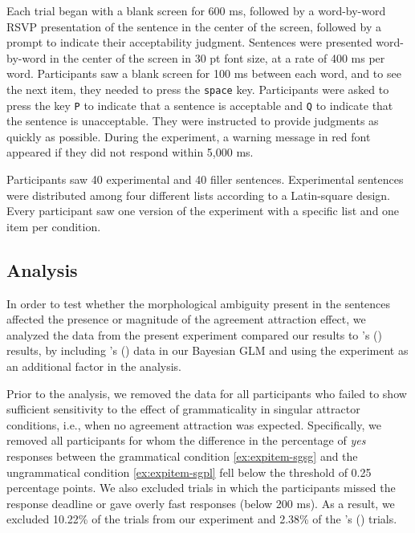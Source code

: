 \documentclass[apacite,linguex]{glossa}\usepackage[]{graphicx}\usepackage[]{color}
\begin{document}
Each trial began with a blank screen for 600 ms, followed by a word-by-word RSVP presentation of the sentence in the center of the screen, followed by a prompt to indicate their acceptability judgment. Sentences were presented word-by-word in the center of the screen in 30 pt font size, at a rate of 400 ms per word. Participants saw a blank screen for 100 ms between each word, and to see the next item, they needed to press the \texttt{space} key. Participants were asked to press the key \texttt{P} to indicate that a sentence is acceptable and \texttt{Q} to indicate that the sentence is unacceptable. They were instructed to provide judgments as quickly as possible. During the experiment, a warning message in red font appeared if they did not respond within 5,000 ms.

Participants saw 40 experimental and 40 filler sentences. Experimental sentences were distributed among four different lists according to a Latin-square design. Every participant saw one version of the experiment with a specific list and one item per condition.

\subsection{Analysis}

In order to test whether the morphological ambiguity present in the \citet{LagoEtAl:2019} sentences affected the presence or magnitude of the agreement attraction effect, we analyzed the data from the present experiment compared our results to \citeauthor{LagoEtAl:2019}'s (\citeyear{LagoEtAl:2019}) results, by including \citeauthor{LagoEtAl:2019}'s (\citeyear{LagoEtAl:2019}) data in our Bayesian GLM and using the experiment as an additional factor in the analysis.
  
Prior to the analysis, we removed the data for all participants who failed to show sufficient sensitivity to the effect of grammaticality in singular attractor conditions, i.e., when no agreement attraction was expected. Specifically, we removed all participants for whom the difference in the percentage of \textit{yes} responses between the grammatical condition \ref{ex:expitem-sgsg} and the ungrammatical condition \ref{ex:expitem-sgpl} fell below the threshold of 0.25 percentage points. We also excluded trials in which the participants missed the response deadline or gave overly fast responses (below 200 ms). As a result, we excluded 10.22\% of the trials from our experiment and 2.38\% of the \citeauthor{LagoEtAl:2019}'s (\citeyear{LagoEtAl:2019}) trials. 
\end{document}
